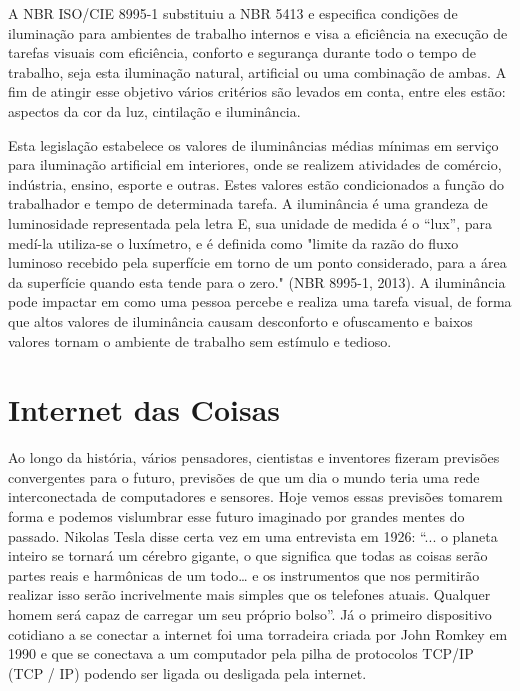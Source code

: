 A NBR ISO/CIE 8995-1 \cite{normabr} substituiu a NBR 5413 e especifica condições de iluminação para ambientes de trabalho internos e visa a eficiência na execução de tarefas visuais com eficiência, conforto e segurança durante todo o tempo de trabalho, seja esta iluminação natural, artificial ou uma combinação de ambas. A fim de atingir esse objetivo vários critérios são levados em conta, entre eles estão: aspectos da cor da luz, cintilação e iluminância.

Esta legislação estabelece os valores de iluminâncias médias mínimas em serviço para iluminação artificial em interiores, onde se realizem atividades de comércio, indústria, ensino, esporte e outras. Estes valores estão condicionados a função do trabalhador e tempo de determinada tarefa. A iluminância é uma grandeza de luminosidade representada pela letra E, sua unidade de medida é o “lux”, para medí-la utiliza-se o luxímetro, e é definida como  "limite da razão do fluxo luminoso recebido pela superfície em torno de um ponto considerado, para a área da superfície quando esta tende para o zero." (NBR 8995-1, 2013).  A iluminância pode impactar em como uma pessoa percebe e realiza uma tarefa visual, de forma que altos valores de iluminância causam desconforto e ofuscamento e baixos valores tornam o ambiente de trabalho sem estímulo e tedioso.


\section{Internet das Coisas}

Ao longo da história, vários pensadores, cientistas e inventores fizeram previsões convergentes para o futuro, previsões de que um dia o mundo teria uma rede interconectada de computadores e sensores. Hoje vemos essas previsões tomarem forma e podemos vislumbrar esse futuro imaginado por grandes mentes do passado. Nikolas Tesla disse certa vez em uma entrevista em 1926: “... o planeta inteiro se tornará um cérebro gigante, o que significa que todas as coisas serão partes reais e harmônicas de um todo… e os instrumentos que nos permitirão realizar isso serão incrivelmente mais simples que os telefones atuais. Qualquer homem será capaz de carregar um seu próprio bolso”. Já o primeiro dispositivo cotidiano a se conectar a internet foi uma torradeira criada por John Romkey em 1990 e que se conectava a um computador pela pilha de protocolos TCP/IP (\acl{TCP} / \acl{IP}) podendo ser ligada ou desligada pela internet.

